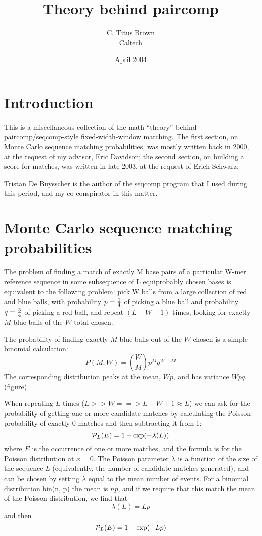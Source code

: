 



\title{Theory behind {\sf paircomp}}
\author{C. Titus Brown\\Caltech}
\date{April 2004}
\maketitle

\tableofcontents

\section{Introduction}

This is a miscellaneous collection of the math ``theory'' behind
{\sf paircomp}/{\sf seqcomp}-style fixed-width-window matching.
The first section, on Monte Carlo sequence matching probabilities,
was mostly written back in 2000, at the request of my advisor, Eric
Davidson; the second section, on building a score for matches, was
written in late 2003, at the request of Erich Schwarz.

Tristan De Buysscher is the author of the {\sf seqcomp} program that
I used during this period, and my co-conspirator in this matter.

\section{Monte Carlo sequence matching probabilities}

The problem of finding a match of exactly M base pairs of a particular W-mer
reference sequence in some subsequence of L equiprobably chosen bases is
equivalent to the following problem: pick W balls from a large collection of
red and blue balls, with probability $p = { 1 \over 4 }$ of picking a blue ball
and probability $q = {3 \over 4}$ of picking a red ball, and repeat $(L - W +
1)$ times, looking for exactly $M$ blue balls of the $W$ total chosen.

The probability of finding exactly $M$ blue balls out of the $W$ chosen
is a simple binomial calculation:
\[
P(M, W) = { W \choose M } p^{M} q^{W - M}
\]
The corresponding distribution peaks at the mean, $Wp$, and has variance
$Wpq$.  (figure)

When repeating $L$ times ($L >> W ==> L-W+1 \approx L$) we can ask for
the probability of getting one or more candidate matches by calculating
the Poisson probability of exactly 0 matches and then subtracting it from
1:
\[
{\cal P}_L(E) = 1 - \exp(-\lambda(L))
\]
where $E$ is the occurrence of one or more matches, and the formula is for
the Poisson distribution at $x=0$.  The Poisson parameter $\lambda$ is
a function of the size of the sequence $L$ (equivalently,
the number of candidate matches generated), and can be chosen by setting
$\lambda$ equal to the mean number of events.  For a binomial
distribution bin(n, p) the mean is $np$, and if
we require that this match the mean of the Poisson distribution, we find
that
\[
\lambda(L) = Lp
\]
and then
\[
{\cal P}_L(E) = 1 - \exp(-L p)
\]

